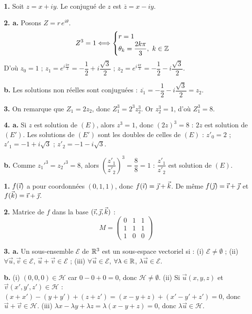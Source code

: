 \documentclass[11pt]{article}
\begin{document}

\textbf{1.} Soit $z = x + iy$. Le conjugué de $z$ est $\overline{z} = x - iy$.

\textbf{2. a.} Posons $Z = r\,e^{i\theta}$.
\[ Z^3 = 1 \Longleftrightarrow \begin{cases} r = 1 \\ \theta_k = \dfrac{2k\pi}{3},\ k \in \mathbb{Z} \end{cases} \]
D'où $z_0 = 1$ ; \quad $z_1 = e^{i\frac{2\pi}{3}} = -\dfrac{1}{2} + i\dfrac{\sqrt{3}}{2}$ ; \quad $z_2 = e^{i\frac{4\pi}{3}} = -\dfrac{1}{2} - i\dfrac{\sqrt{3}}{2}$.

\textbf{b.} Les solutions non réelles sont conjuguées : $\overline{z_1} = -\dfrac{1}{2} - i\dfrac{\sqrt{3}}{2} = z_2$.

\textbf{3.} On remarque que $Z_1 = 2z_2$, donc $Z_1^3 = 2^3 z_2^3$. Or $z_2^3 = 1$, d'où $Z_1^3 = 8$.

\textbf{4. a.} Si $z$ est solution de $(E)$, alors $z^3 = 1$, donc $(2z)^3 = 8$ : $2z$ est solution de $(E')$. Les solutions de $(E')$ sont les doubles de celles de $(E)$ : $z'_0 = 2$ ; $z'_1 = -1 + i\sqrt{3}$ ; $z'_2 = -1 - i\sqrt{3}$.

\textbf{b.} Comme $z_1'^3 = z_2'^3 = 8$, alors $\left(\dfrac{z'_1}{z'_2}\right)^3 = \dfrac{8}{8} = 1$ : $\dfrac{z'_1}{z'_2}$ est solution de $(E)$.

\textbf{1.} $f(\vec{\imath})$ a pour coordonnées $(0, 1, 1)$, donc $f(\vec{\imath}) = \vec{\jmath} + \vec{k}$. De même $f(\vec{\jmath}) = \vec{\imath} + \vec{\jmath}$ et $f(\vec{k}) = \vec{\imath} + \vec{\jmath}$.

\textbf{2.} Matrice de $f$ dans la base $(\vec{\imath}, \vec{\jmath}, \vec{k})$ :
\[ M = \begin{pmatrix} 0 & 1 & 1 \\ 1 & 1 & 1 \\ 1 & 0 & 0 \end{pmatrix} \]

\textbf{3. a.} Un sous-ensemble $\mathscr{E}$ de $\mathbb{R}^3$ est un sous-espace vectoriel si : (i) $\mathscr{E} \ne \emptyset$ ; (ii) $\forall \vec{u}, \vec{v} \in \mathscr{E}$, $\vec{u} + \vec{v} \in \mathscr{E}$ ; (iii) $\forall \vec{u} \in \mathscr{E}$, $\forall \lambda \in \mathbb{R}$, $\lambda\vec{u} \in \mathscr{E}$.

\textbf{b.} (i) $(0,0,0) \in \mathscr{H}$ car $0 - 0 + 0 = 0$, donc $\mathscr{H} \ne \emptyset$. (ii) Si $\vec{u}(x,y,z)$ et $\vec{v}(x',y',z') \in \mathscr{H}$ : $(x+x') - (y+y') + (z+z') = (x-y+z) + (x'-y'+z') = 0$, donc $\vec{u}+\vec{v} \in \mathscr{H}$. (iii) $\lambda x - \lambda y + \lambda z = \lambda(x-y+z) = 0$, donc $\lambda\vec{u} \in \mathscr{H}$.
\end{document}
